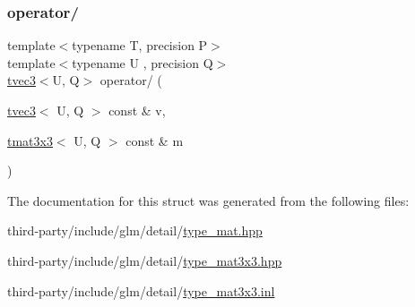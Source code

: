 \mbox{\label{structglm_1_1detail_1_1tmat3x3_a62cedcc444ac62727b8ae82f6b3249b8}} 
\subsubsection{\texorpdfstring{operator/}{operator/}\hspace{0.1cm}{\footnotesize\ttfamily [2/2]}}
{\footnotesize\ttfamily template$<$typename T, precision P$>$ \\
template$<$typename U , precision Q$>$ \\
\hyperlink{structglm_1_1detail_1_1tvec3}{tvec3}$<$U, Q$>$ operator/ (\begin{DoxyParamCaption}\item[{\hyperlink{structglm_1_1detail_1_1tvec3}{tvec3}$<$ U, Q $>$ const \&}]{v,  }\item[{\hyperlink{structglm_1_1detail_1_1tmat3x3}{tmat3x3}$<$ U, Q $>$ const \&}]{m }\end{DoxyParamCaption})\hspace{0.3cm}{\ttfamily [friend]}}



The documentation for this struct was generated from the following files\+:\begin{DoxyCompactItemize}
\item 
third-\/party/include/glm/detail/\hyperlink{type__mat_8hpp}{type\+\_\+mat.\+hpp}\item 
third-\/party/include/glm/detail/\hyperlink{type__mat3x3_8hpp}{type\+\_\+mat3x3.\+hpp}\item 
third-\/party/include/glm/detail/\hyperlink{type__mat3x3_8inl}{type\+\_\+mat3x3.\+inl}\end{DoxyCompactItemize}
